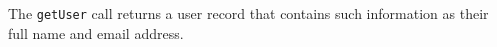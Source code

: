 The \verb+getUser+ call returns a user record that contains such information as their full name and email address.
